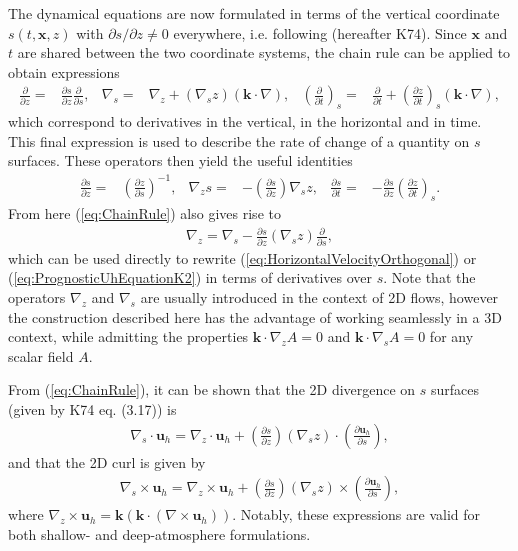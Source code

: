 \documentclass[gmd, manuscript]{copernicus}
\newcommand{\vb}{\mathbf}
\newcommand{\pdiff}[2]{\frac{\partial #1}{\partial #2}}
\begin{document}
The dynamical equations are now formulated in terms of the vertical coordinate $s(t,\vb{x},z)$ with $\partial s / \partial z \neq 0$ everywhere, i.e. following \cite{kasahara1974various} (hereafter K74).  Since $\vb{x}$ and $t$ are shared between the two coordinate systems, the chain rule can be applied to obtain expressions
\begin{align} \label{eq:ChainRule}
\pdiff{}{z} =& \pdiff{s}{z} \pdiff{}{s}, & \nabla_s =& \nabla_z + (\nabla_s z) (\vb{k} \cdot \nabla), & \left( \pdiff{}{t} \right)_s =& \pdiff{}{t} + \left( \pdiff{z}{t} \right)_s (\vb{k} \cdot \nabla),
\end{align} which correspond to derivatives in the vertical, in the horizontal and in time.  This final expression is used to describe the rate of change of a quantity on $s$ surfaces.  These operators then yield the useful identities
\begin{align} \label{eq:NablaZSIdentity}
\pdiff{s}{z} =& \left( \pdiff{z}{s} \right)^{-1}, & \nabla_z s =& - \left( \pdiff{s}{z} \right) \nabla_s z, & \pdiff{s}{t} =& - \pdiff{s}{z} \left( \pdiff{z}{t} \right)_s.
\end{align}  From here (\ref{eq:ChainRule}) also gives rise to
\begin{align} \label{eq:HorizontalChainRule}
\nabla_z = \nabla_s - \pdiff{s}{z} (\nabla_s z) \pdiff{}{s},
\end{align} which can be used directly to rewrite (\ref{eq:HorizontalVelocityOrthogonal}) or (\ref{eq:PrognosticUhEquationK2}) in terms of derivatives over $s$.  Note that the operators $\nabla_z$ and $\nabla_s$ are usually introduced in the context of 2D flows, however the construction described here has the advantage of working seamlessly in a 3D context, while admitting the properties $\vb{k} \cdot \nabla_z A = 0$ and $\vb{k} \cdot \nabla_s A = 0$ for any scalar field $A$.

From (\ref{eq:ChainRule}), it can be shown that the 2D divergence on $s$ surfaces (given by K74 eq. (3.17)) is
\begin{align} \label{eq:DivergenceS}
\nabla_s \cdot \vb{u}_h = \nabla_z \cdot \vb{u}_h + \left( \pdiff{s}{z} \right) (\nabla_s z) \cdot \left( \pdiff{\vb{u}_h}{s} \right),
\end{align} and that the 2D curl is given by
\begin{align} \label{eq:CurlS}
\nabla_s \times \vb{u}_h = \nabla_z \times \vb{u}_h + \left( \pdiff{s}{z} \right) (\nabla_s z) \times \left( \pdiff{\vb{u}_h}{s} \right),
\end{align} where $\nabla_z \times \vb{u}_h = \vb{k} (\vb{k} \cdot (\nabla \times \vb{u}_h))$.  Notably, these expressions are valid for both shallow- and deep-atmosphere formulations.
\end{document}
